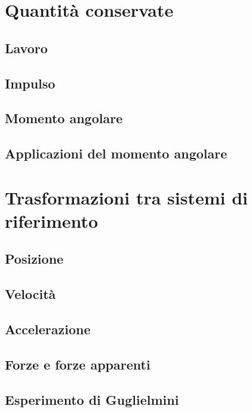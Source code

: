 \documentclass[a4paper]{article}
\begin{document}
\section{Quantità conservate}
\subsection{Lavoro}
\subsection{Impulso}
\subsection{Momento angolare}
\subsection{Applicazioni del momento angolare}

\section{Trasformazioni tra sistemi di riferimento}
\subsection{Posizione}
\subsection{Velocità}
\subsection{Accelerazione}
\subsection{Forze e forze apparenti}
\subsection{Esperimento di Guglielmini}
\end{document}
